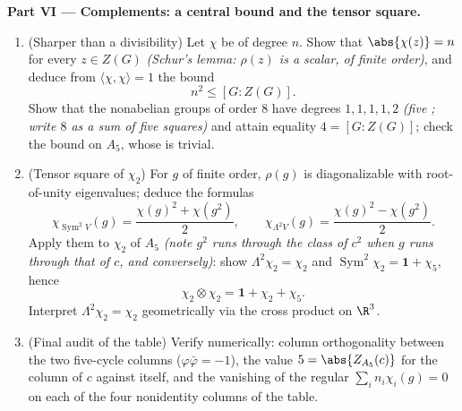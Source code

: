 \begin{problem}
\medskip
\noindent\textbf{Part VI --- Complements: a central bound and
the tensor square.}
\begin{enumerate}[resume]
  \item (Sharper than a divisibility) Let $\chi$ be 
        of degree $n$. Show that $\abs{\chi(z)} = n$ for every
        $z \in Z(G)$ \emph{(Schur's lemma: $\rho(z)$ is a
        scalar, of finite order)}, and deduce from
        $\langle\chi, \chi\rangle = 1$ the bound
        \[
        n^2 \leq [G : Z(G)] .
        \]
        Show that the nonabelian groups of order $8$ have
         degrees $1, 1, 1, 1, 2$ \emph{(five
        ; write $8$ as a sum of five squares)}
        and attain equality $4 = [G : Z(G)]$; check the bound
        on $A_5$, whose  is trivial.
  \item (Tensor square of $\chi_2$) For $g$ of finite order,
        $\rho(g)$ is diagonalizable with root-of-unity
        eigenvalues; deduce the  formulas
        \[
        \chi_{\operatorname{Sym}^2 V}(g)
        = \frac{\chi(g)^2 + \chi(g^2)}2,
        \qquad
        \chi_{\Lambda^2 V}(g)
        = \frac{\chi(g)^2 - \chi(g^2)}2 .
        \]
        Apply them to $\chi_2$ of $A_5$ \emph{(note $g^2$ runs
        through the class of $c^2$ when $g$ runs through that
        of $c$, and conversely)}: show $\Lambda^2\chi_2 =
        \chi_2$ and $\operatorname{Sym}^2\chi_2 = \mathbf 1 +
        \chi_5$, hence
        \[
        \chi_2\otimes\chi_2 = \mathbf 1 + \chi_2 + \chi_5 .
        \]
        Interpret $\Lambda^2\chi_2 = \chi_2$ geometrically via
        the cross product on $\R^3$.
  \item (Final audit of the table) Verify numerically: column
        orthogonality between the two five-cycle columns
        ($\varphi\bar\varphi = -1$), the value $5 =
        \abs{Z_{A_5}(c)}$ for the column of $c$ against itself,
        and the vanishing of the regular  $\sum_i
        n_i\chi_i(g) = 0$ on each of the four nonidentity
        columns of the table.
\end{enumerate}
\end{problem}
